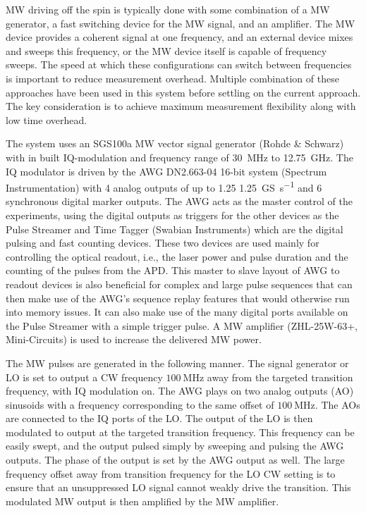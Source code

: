  \gls{MW} driving off the spin is typically done with some combination of a \gls{MW} generator, a fast switching device for the \gls{MW} signal, and an amplifier. The \gls{MW} device provides a coherent signal at one frequency, and an external device mixes and sweeps this frequency, or the \gls{MW} device itself is capable of frequency sweeps. The speed at which these configurations can switch between frequencies is important to reduce measurement overhead. Multiple combination of these approaches have been used in this system before settling on the current approach. The key consideration is to achieve maximum measurement flexibility along with low time overhead.

 The system uses an SGS100a \gls{MW} vector signal generator (Rohde \& Schwarz) with in built \gls{IQ}-modulation and frequency range of \qty{30}{\mega\hertz} to  \qty{12.75}{\giga\hertz}. The \gls{IQ} modulator is driven by the \gls{AWG} DN2.663-04 16-bit system (Spectrum Instrumentation) with 4 analog outputs of up to 1.25 \qty{1.25}{\giga S\per\second} and 6 synchronous digital marker outputs. The \gls{AWG} acts as the master control of the experiments, using the digital outputs as triggers for the other devices as the Pulse Streamer and Time Tagger (Swabian Instruments) which are the digital pulsing and fast counting devices. These two devices are used mainly for controlling the optical readout, i.e., the laser power and pulse duration and the counting of the pulses from the \gls{APD}. This master to slave layout of \gls{AWG} to readout devices is also beneficial for complex and large pulse sequences that can then make use of the \gls{AWG}'s sequence replay features\cite{spectrumAWG} that would otherwise run into memory issues. It can also make use of the many digital ports available on the Pulse Streamer with a simple trigger pulse. A \gls{MW} amplifier (ZHL-25W-63+, Mini-Circuits) is used to increase the delivered \gls{MW} power.

 The \gls{MW} pulses are generated in the following manner. The signal generator or \gls{LO} is set to output a \gls{CW} frequency $\qty{100}{\mega\hertz}$ away from the targeted transition frequency, with \gls{IQ} modulation on. The \gls{AWG} plays on two analog outputs (\gls{AO}) sinusoids with a frequency corresponding to the same offset of $\qty{100}{\mega\hertz}$. The AOs are connected to the \gls{IQ} ports of the \gls{LO}. The output of the \gls{LO} is then modulated to output at the targeted transition frequency\cite{markiIQ}. This frequency can be easily swept, and the output pulsed simply by sweeping and pulsing the \gls{AWG} outputs. The phase of the output is set by the \gls{AWG} output as well. The large frequency offset away from transition frequency for the \gls{LO} \gls{CW} setting is to ensure that an unsuppressed \gls{LO} signal cannot weakly drive the transition. This modulated \gls{MW} output is then amplified by the \gls{MW} amplifier.
 
